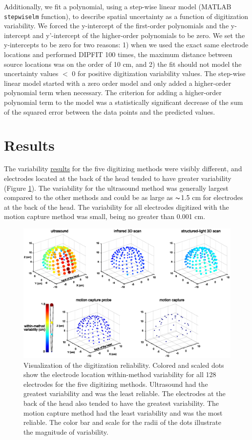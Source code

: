 \documentclass[../thesis_seyed.tex]{subfiles}
\begin{document}
Additionally, we fit a polynomial, using a step-wise linear model (MATLAB {\tt stepwiselm} function), to describe spatial uncertainty as a function of digitization variability. We forced the y-intercept of the first-order polynomials and the y-intercept and y'-intercept of the higher-order polynomials to be zero. We set the y-intercepts to be zero for two reasons: 1) when we used the exact same electrode locations and performed DIPFIT 100 times, the maximum distance between source locations was on the order of 10 cm, and 2) the fit should not model the uncertainty values $<$ 0 for positive digitization variability values. The step-wise linear model started with a zero order model and only added a higher-order polynomial term when necessary. The criterion for adding a higher-order polynomial term to the model was a statistically significant decrease of the sum of the squared error between the data points and the predicted values.

\section{Results}

The variability \ul{results} for the five digitizing methods were visibly different, and electrodes located at the back of the head tended to have greater variability (Figure \ref{fig:r1}). The variability for the ultrasound method was generally largest compared to the other methods and could be as large as $\thicksim$1.5 cm for electrodes at the back of the head. The variability for all electrodes digitized with the motion capture method was small, being no greater than 0.001 cm. 

\begin{figure}[bt!]
    \centering
    \includegraphics[width=\linewidth]{../img/result1.eps}
    \caption{Visualization of the digitization reliability. Colored and scaled dots show the electrode location within-method variability for all 128 electrodes for the five digitizing methods. Ultrasound had the greatest variability and was the least reliable. The electrodes at the back of the head also tended to have the greatest variability. The motion capture method had the least variability and was the most reliable. The color bar and scale for the radii of the dots illustrate the magnitude of variability.}
    \label{fig:r1}
\end{figure}
\end{document}
